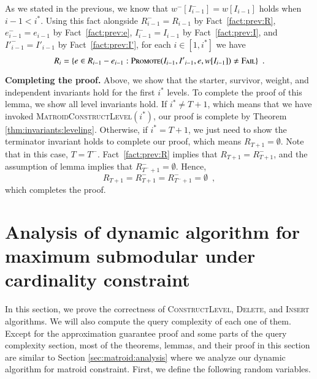 \documentclass[11pt]{article}
\newcommand{\err}{{\textsc{Fail}}}
\newcommand{\constLevel}{\textsc{ConstructLevel}}
\newcommand{\MatroidConstLevel}{\textsc{MatroidConstructLevel}}
\newcommand{\replacementTester}{\textsc{Promote}}
\newcommand{\insertv}{{\textsc{Insert}}}
\newcommand{\deletev}{{\textsc{Delete}}}
\begin{document}
As we stated in the previous, we  know that $w^-[I_{i - 1}^-] = w[I_{i - 1}]$ holds when $i-1<i^*$.
Using this fact alongside $R_{i-1}^-=R_{i-1}$ by Fact~\ref{fact:prev:R}, $e_{i-1}^-=e_{i-1}$ by Fact~\ref{fact:prev:e}, $I_{i-1}^-=I_{i-1}$ by Fact~\ref{fact:prev:I}, and ${I'}_{i-1}^-={I'}_{i-1}$ by Fact~\ref{fact:prev:I'}, for each $i\in[1,i^*]$ we have
$$
R_i = \{ e \in R_{i-1} - e_{i-1}: \replacementTester{}(I_{i-1}, {I'}_{i-1}, e, w[I_{i - 1}]) \ne \err\} \enspace.
$$


\textbf{Completing the proof. }
Above, we show that the starter, survivor, weight, and independent invariants hold for the first $i^*$ levels.
To complete the proof of this lemma, we show all level invariants hold.
If $i^* \ne T + 1$, which means that we have invoked \MatroidConstLevel$(i^*)$, our proof is complete by Theorem \ref{thm:invariants:leveling}. 
Otherwise, if $i^* = T + 1$, we just need to show the terminator invariant holds to complete our proof, which means $R_{T + 1} = \emptyset$. 
Note that in this case, $T=T^-$.
Fact~\ref{fact:prev:R} implies that $R_{T + 1}=R_{T + 1}^-$, and the assumption of lemma implies that $R_{T^- + 1}^- = \emptyset$.
Hence,
$$
R_{T + 1} = R_{T + 1}^- = R_{T^- + 1}^- = \emptyset \enspace,
$$
which completes the proof.
\\ 
\section{Analysis of dynamic algorithm for maximum submodular under cardinality constraint}
\label{sec:analysis:klogk}
In this section, we prove the correctness of \constLevel{}, \deletev{}, and \insertv{} algorithms. We will also compute the query complexity of each one of them. 
Except for the approximation guarantee proof and some parts of the query complexity section, most of the theorems, lemmas, and their proof in this section are similar to Section \ref{sec:matroid:analysis} where we analyze our dynamic algorithm for matroid constraint.
First, we define the following random variables. 
\end{document}
